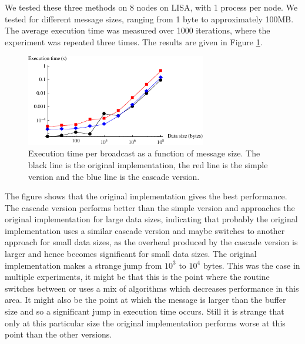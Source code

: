 \documentclass[11pt,a4paper,onecolumn]{article}
\begin{document}
We tested these three methods on 8 nodes on LISA, with 1 process per node. We tested for different message sizes, ranging from 1 byte to approximately 100MB. The average execution time was measured over 1000 iterations, where the experiment was repeated three times. The results are given in Figure \ref{fig:broadcast}.

\begin{figure}[H]
  \centering
  \includegraphics[width=0.7\textwidth]{broadcast.pdf}
  \caption{Execution time per broadcast as a function of message size. The black line is the original implementation, the red line is the simple version and the blue line is the cascade version.}
  \label{fig:broadcast}
\end{figure}

The figure shows that the original implementation gives the best performance. The cascade version performs better than the simple version and approaches the original implementation for large data sizes, indicating that probably the original implementation uses a similar cascade version and maybe switches to another approach for small data sizes, as the overhead produced by the cascade version is larger and hence becomes significant for small data sizes. The original implementation makes a strange jump from $10^3$ to $10^4$ bytes. This was the case in multiple experiments, it might be that this is the point where the routine switches between or uses a mix of algorithms which decreases performance in this area. It might also be the point at which the message is larger than the buffer size and so a significant jump in execution time occurs. Still it is strange that only at this particular size the original implementation performs worse at this point than the other versions.
\end{document}
